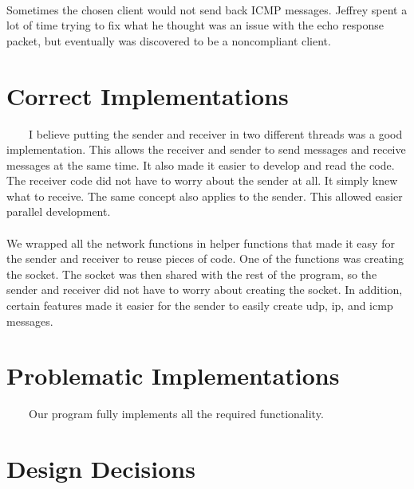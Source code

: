 \documentclass[11pt]{article}
\begin{document}
\paragraph{} Sometimes the chosen client would not send back ICMP messages. Jeffrey spent a lot of time trying to fix what he thought was an issue with the echo response packet, but eventually was discovered to be a noncompliant client.

\section{Correct Implementations}
\ \ \ \ I believe putting the sender and receiver in two different threads was a good implementation. This allows the receiver and sender to send messages and receive messages at the same time. It also made it easier to develop and read the code. The receiver code did not have to worry about the sender at all. It simply knew what to receive. The same concept also applies to the sender. This allowed easier parallel development.
\paragraph{} We wrapped all the network functions in helper functions that made it easy for the sender and receiver to reuse pieces of code. One of the functions was creating the socket. The socket was then shared with the rest of the program, so the sender and receiver did not have to worry about creating the socket. In addition, certain features made it easier for the sender to easily create udp, ip, and icmp messages.

\section{Problematic Implementations}
\ \ \ \ Our program fully implements all the required functionality.

\section{Design Decisions}
\end{document}

